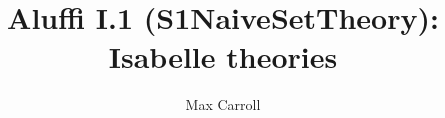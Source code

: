 \documentclass[11pt,a4paper]{article}
\begin{document}
\title{Aluffi I.1 (S1NaiveSetTheory): Isabelle theories}
\author{Max Carroll}
\maketitle


\end{document}
